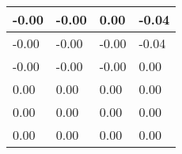 \begin{tabular}{|l|l|l|l|}
\hline
-0.00&-0.00&0.00&-0.04\\\hline
-0.00&-0.00&-0.00&-0.04\\\hline
-0.00&-0.00&-0.00&0.00\\\hline
0.00&0.00&0.00&0.00\\\hline
0.00&0.00&0.00&0.00\\\hline
0.00&0.00&0.00&0.00\\\hline
\end{tabular}
